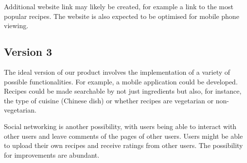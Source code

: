 Additional website link may likely be created, for example a link to the most popular recipes. The website is also expected to be optimised for mobile phone viewing.

\subsection{Version 3}
The ideal version of our product involves the implementation of a variety of possible functionalities. For example, a mobile application could be developed. Recipes could be made searchable by not just ingredients but also, for instance, the type of cuisine (Chinese dish) or whether recipes are vegetarian or non-vegetarian. 

Social networking is another possibility, with users being able to interact with other users and leave comments of the pages of other users. Users might be able to upload their own recipes and receive ratings from other users. The possibility for improvements are abundant.
